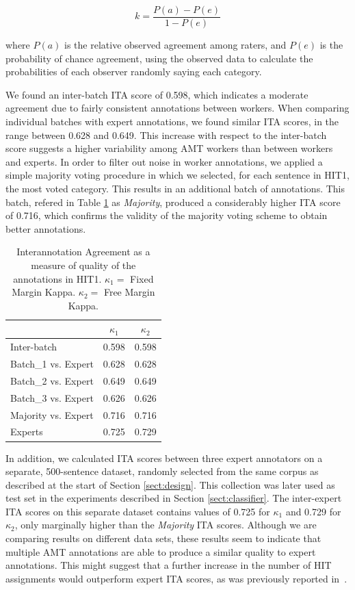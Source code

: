 \documentclass[11pt, a4paper,onecolumn]{article}
\begin{document}
$$k=\frac{P(a)-P(e)}{1-P(e)}$$

where $P(a)$ is the relative observed agreement among raters, and $P(e)$ is the probability of chance agreement, using the observed data to calculate the probabilities of each observer randomly saying each category.


We found an inter-batch ITA score of 0.598, which indicates a moderate agreement due to fairly consistent annotations between workers. When comparing individual batches with expert annotations, we found similar ITA scores, in the range between 0.628 and 0.649. This increase with respect to the inter-batch score suggests a higher variability among AMT workers than between workers and experts. 
In order to filter out noise in worker annotations, we applied a simple majority voting procedure in which we selected, for each sentence in HIT1, the most voted category. This results in an additional batch of annotations. This batch, refered in Table \ref{tablita} as \textit{Majority}, produced a considerably higher ITA score of 0.716, which confirms the validity of the majority voting scheme to obtain better annotations.

\begin{table}[h]
\begin{center}
\begin{tabular}{|l|c|c|}
\hline
& $\kappa_{1}$ & $\kappa_{2}$ \\ 
\hline
Inter-batch & 0.598 & 0.598 \\ \hline
Batch\_1 vs. Expert & 0.628 & 0.628\\
Batch\_2 vs. Expert & 0.649 & 0.649\\
Batch\_3 vs. Expert & 0.626 & 0.626\\ \hline
Majority vs. Expert & 0.716 & 0.716\\ \hline
Experts& 0.725 & 0.729\\ \hline
\end{tabular}
\end{center}
\caption{Interannotation Agreement as a measure of quality of the annotations in HIT1. $\kappa_{1} = $ Fixed Margin Kappa. $\kappa_{2} = $ Free Margin Kappa.}
\label{tablita}
\end{table}


In addition, we calculated ITA scores between three expert annotators on a separate, 500-sentence dataset, randomly selected from the same corpus as described at the start of Section \ref{sect:design}. This collection was later used as test set in the experiments described in Section \ref{sect:classifier}. The inter-expert ITA scores on this separate dataset contains values of 0.725 for $\kappa_{1}$ and 0.729 for $\kappa_{2}$, only marginally higher than the \textit{Majority} ITA scores. Although we are comparing results on different data sets, these results seem to indicate that multiple AMT annotations are able to produce a similar quality to expert annotations. This might suggest that a further increase in the number of HIT assignments would outperform expert ITA scores, as was previously reported in~\cite{snow_cheap_2008}.
\end{document}
